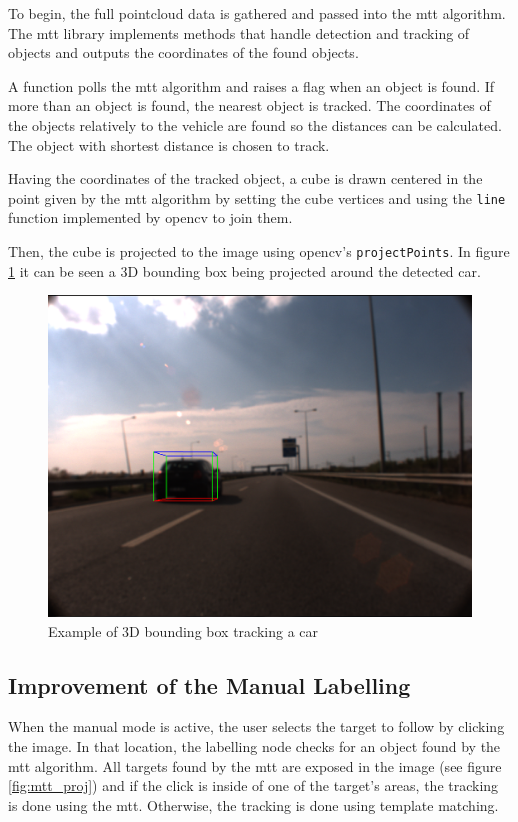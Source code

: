 To begin, the full pointcloud data is gathered and passed into the \gls{mtt} algorithm. The \gls{mtt} library implements methods that handle detection and tracking of objects and outputs the coordinates of the found objects. 

A function polls the \gls{mtt} algorithm and raises a flag when an object is found. If more than an object is found, the nearest object is tracked. The coordinates of the objects relatively to the vehicle are found so the distances can be calculated. The object with shortest distance is chosen to track.

Having the coordinates of the tracked object, a cube is drawn centered in the point given by the \gls{mtt} algorithm by setting the cube vertices and using the \texttt{line} function implemented by \gls{opencv} to join them.

Then, the cube is projected to the image using \gls{opencv}'s \texttt{projectPoints}. In figure \ref{fig:cube} it can be seen a 3D bounding box being projected around the detected car.

\begin{figure}[htp]
	
	\centering
	\includegraphics[width=.7\textwidth]{caplabel/imgs/3dcube.png}
	
	\caption{Example of 3D bounding box tracking a car}
	\label{fig:cube}
	
\end{figure}

\subsection{Improvement of the Manual Labelling}

When the manual mode is active, the user selects the target to follow by clicking the image. In that location, the labelling node checks for an object found by the \gls{mtt} algorithm. All targets found by the \gls{mtt} are exposed in the image (see figure \ref{fig:mtt_proj}) and if the click is inside of one of the target's areas, the tracking is done using the \gls{mtt}. Otherwise, the tracking is done using template matching.

